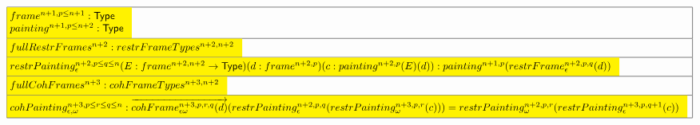 \documentclass[a4paper,english,cleveref,autoref,thm-restate]{article}
\newcommand{\Type}{\mathsf{Type}}
\begin{document}
\begin{tiny}
{$
  \begin{array}{|l|}
    \hline
    \!\!\!\colorbox{yellow}{$
      \!\!\!
      \begin{array}{l}
        frame^{n+1,p\leq n+1}:\Type\\
        painting^{n+1,p\leq n+2}:\Type\\
      \end{array}
    $}\\
    \hline
    \!\!\!\colorbox{yellow}{$
      \!\!\!
      \begin{array}[t]{l}
        fullRestrFrames^{n+2}:restrFrameTypes^{n+2,n+2}\\
      \end{array}
    $}\\
    \hline
    \!\!\!\colorbox{yellow}{$
      \!\!\!
      \begin{array}{l}
        restrPainting^{n+2,p\leq q \leq n}_\epsilon(E:frame^{n+2,n+2}\rightarrow \Type)(d:frame^{n+2,p})(c:painting^{n+2,p}(E)(d)): painting^{n+1,p}(restrFrame^{n+2,p,q}_{\epsilon}(d))\\
      \end{array}
    $}\!\!\!\\
    \hline
    \!\!\!\colorbox{yellow}{$
      \!\!\!
      \begin{array}{l}
        fullCohFrames^{n+3}:cohFrameTypes^{n+3,n+2}\\
      \end{array}
    $}\\
    \hline
    \!\!\!\colorbox{yellow}{$
      \!\!\!
      \begin{array}{l}
        cohPainting_{\epsilon,\omega}^{n+3,p\leq r\leq q\leq n}: \overrightarrow{cohFrame^{n+3,p,r,q}_{\epsilon\omega}(d)}(restrPainting^{n+2,p,q}_{\epsilon}(restrPainting^{n+3,p,r}_{\omega}(c))) = restrPainting^{n+2,p,r}_{\omega}(restrPainting^{n+3,p,q+1}_{\epsilon}(c))\\
      \end{array}
    $}\\
    \hline
  \end{array}
$
}
\end{tiny}
\end{document}
